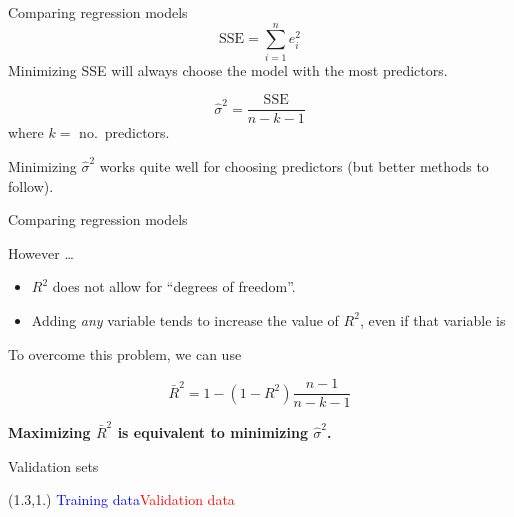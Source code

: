 \documentclass[14pt]{beamer}
\begin{document}
\begin{frame}{Comparing regression models}
\[\text{SSE} = \sum_{i=1}^n e_i^2 \]
Minimizing SSE will always choose the model with the most predictors.

\pause
{}
\[
\hat{\sigma}^2 = \frac{\text{SSE}}{n-k-1}
\]
where $k=$ no.\ predictors.\pause

Minimizing $\hat{\sigma}^2$ works quite well for choosing predictors (but better methods to follow).

\end{frame}


\begin{frame}{Comparing regression models}

However \dots
\begin{itemize}
\item $R^2$  does not allow for ``degrees of freedom''.

\item Adding \textit{any} variable tends to increase the value of $R^2$, even if that variable is
\end{itemize}\pause

To overcome   this problem, we can use 
\begin{block}{}
\[
\bar{R}^2 = 1-(1-R^2)\frac{n-1}{n-k-1}
\]
\end{block}
\pause

\centerline{\textcolor[rgb]{0.8,0.00,0.00}{\textbf{Maximizing $\bar{R}^2$ is equivalent to minimizing $\hat\sigma^2$.}}}

\end{frame}


\begin{frame}{Validation sets}
\begin{textblock}{12}(1.3,1.)
\textcolor{blue}{Training data}\hspace*{4cm}\textcolor{red}{Validation data}
\end{textblock}

\end{frame}
\end{document}
